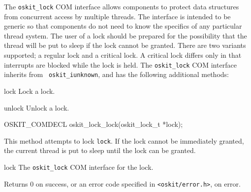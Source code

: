 %
% 
%
\label{synch}


The {\tt oskit_lock} COM interface allows components to protect data
structures from concurrent access by multiple threads. The interface is
intended to be generic so that components do not need to know the specifics
of any particular thread system. The user of a lock should be prepared for
the possibility that the thread will be put to sleep if the lock cannot be
granted. There are two variants supported; a regular lock and a critical
lock. A critical lock differs only in that interrupts are blocked while the
lock is held. The {\tt oskit_lock} COM interface inherits from {\tt
oskit_iunknown}, and has the following additional methods:

\begin{icsymlist}
\item[lock]
	Lock a lock.
\item[unlock]
	Unlock a lock.
\end{icsymlist}

\begin{apisyn}

	\funcproto OSKIT_COMDECL
	oskit_lock_lock(oskit_lock_t *lock);
\end{apisyn}
\begin{apidesc}
	This method attempts to lock {\tt lock}. If the lock cannot be
	immediately granted, the current thread is put to sleep until the
	lock can be granted.
\end{apidesc}
\begin{apiparm}
	\item[lock]
		The {\tt oskit_lock} COM interface for the lock.
\end{apiparm}
\begin{apiret}
	Returns 0 on success, or an error code specified in
	{\tt <oskit/error.h>}, on error.
\end{apiret}


